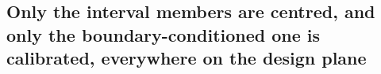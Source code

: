 \subsection*{Only the interval members are centred, and only the boundary-conditioned one
is calibrated, everywhere on the design plane}
